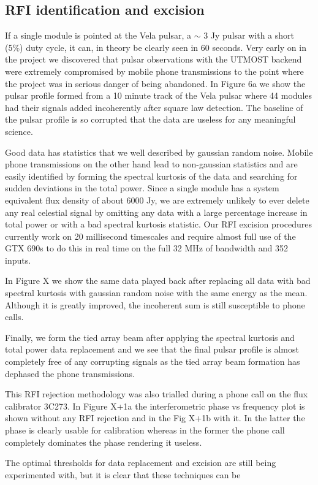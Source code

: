 \subsection{RFI identification and excision}

If a single module is pointed at the Vela pulsar, a $\sim$ 3 Jy pulsar with a short (5\%) duty cycle, it can, in theory be clearly seen in 60 seconds. Very early on in the project we discovered that pulsar observations with the UTMOST backend were extremely compromised by mobile phone transmissions to the point where the project was in serious danger of being abandoned. In Figure 6a we show the pulsar profile formed from a 10 minute track of the Vela pulsar where 44 modules had their signals added incoherently after square law detection. The baseline of the pulsar profile is so corrupted that the data are useless for any meaningful science.

Good data has statistics that we well described by gaussian random noise. Mobile phone transmissions on the other hand lead to non-gaussian statistics and are easily identified by forming the spectral kurtosis of the data and searching for sudden deviations in the total power. Since a single module has a system equivalent flux density of about 6000 Jy, we are extremely unlikely to ever delete any real celestial signal by omitting any data with a large percentage increase in total power or with a bad spectral kurtosis statistic. Our RFI excision procedures currently work on 20 millisecond timescales and require almost full use of the GTX 690s to do this in real time on the full 32 MHz of bandwidth and 352 inputs.

In Figure X we show the same data played back after replacing all data with bad spectral kurtosis with gaussian random noise with the same energy as the mean. Although it is greatly improved, the incoherent sum is still susceptible to phone calls.

Finally, we form the tied array beam after applying the spectral kurtosis and total power data replacement and we see that the final pulsar profile is almost completely free of any corrupting signals as the tied array beam formation has dephased the phone transmissions.

This RFI rejection methodology was also trialled during a phone call on the flux calibrator 3C273. In Figure X+1a the interferometric phase vs frequency plot is shown without any RFI rejection and in the Fig X+1b with it. In the latter the phase is clearly usable for calibration whereas in the former the phone call completely dominates the phase rendering it useless.

The optimal thresholds for data replacement and excision are still being experimented with, but it is clear that these techniques can be 



